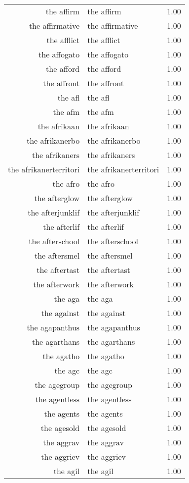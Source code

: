 \begin{table}[ht]
\begin{tabular}{rlr}
  the affirm & the affirm & 1.00 \\ 
  the affirmative & the affirmative & 1.00 \\ 
  the afflict & the afflict & 1.00 \\ 
  the affogato & the affogato & 1.00 \\ 
  the afford & the afford & 1.00 \\ 
  the affront & the affront & 1.00 \\ 
  the afl & the afl & 1.00 \\ 
  the afm & the afm & 1.00 \\ 
  the afrikaan & the afrikaan & 1.00 \\ 
  the afrikanerbo & the afrikanerbo & 1.00 \\ 
  the afrikaners & the afrikaners & 1.00 \\ 
  the afrikanerterritori & the afrikanerterritori & 1.00 \\ 
  the afro & the afro & 1.00 \\ 
  the afterglow & the afterglow & 1.00 \\ 
  the afterjunklif & the afterjunklif & 1.00 \\ 
  the afterlif & the afterlif & 1.00 \\ 
  the afterschool & the afterschool & 1.00 \\ 
  the aftersmel & the aftersmel & 1.00 \\ 
  the aftertast & the aftertast & 1.00 \\ 
  the afterwork & the afterwork & 1.00 \\ 
  the aga & the aga & 1.00 \\ 
  the against & the against & 1.00 \\ 
  the agapanthus & the agapanthus & 1.00 \\ 
  the agarthans & the agarthans & 1.00 \\ 
  the agatho & the agatho & 1.00 \\ 
  the agc & the agc & 1.00 \\ 
  the agegroup & the agegroup & 1.00 \\ 
  the agentless & the agentless & 1.00 \\ 
  the agents & the agents & 1.00 \\ 
  the agesold & the agesold & 1.00 \\ 
  the aggrav & the aggrav & 1.00 \\ 
  the aggriev & the aggriev & 1.00 \\ 
  the agil & the agil & 1.00 \\ 

\end{tabular}
\end{table}

